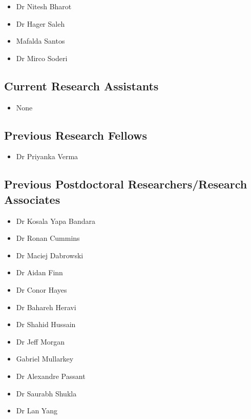 \documentclass[10pt,a4paper]{res} %
\begin{document}
\begin{resume}
\begin{itemize} \itemsep -2pt
\item Dr Nitesh Bharot
\item Dr Hager Saleh
\item Mafalda Santos
\item Dr Mirco Soderi
\end{itemize}

\subsection*{Current Research Assistants}

\begin{itemize} \itemsep -2pt
\item None
\end{itemize}

\subsection*{Previous Research Fellows}

\begin{itemize} \itemsep -2pt
\item Dr Priyanka Verma
\end{itemize}

\subsection*{Previous Postdoctoral Researchers/Research Associates}

\begin{itemize} \itemsep -2pt
\item Dr Kosala Yapa Bandara
\item Dr Ronan Cummins
\item Dr Maciej Dabrowski
\item Dr Aidan Finn
\item Dr Conor Hayes
\item Dr Bahareh Heravi
\item Dr Shahid Hussain
\item Dr Jeff Morgan
\item Gabriel Mullarkey
\item Dr Alexandre Passant
\item Dr Saurabh Shukla
\item Dr Lan Yang
\end{itemize}


\end{resume}
\end{document}
